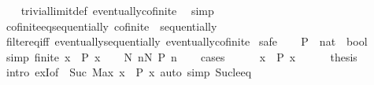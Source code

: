 \begin{isabellebody}
%
\isadelimproof
\ \ %
\endisadelimproof
%
\isatagproof
{}\isamarkupfalse%
\ trivial{\isacharunderscore}{\kern0pt}limit{\isacharunderscore}{\kern0pt}def\ eventually{\isacharunderscore}{\kern0pt}cofinite\ \isamarkupfalse%
\ simp%
\endisatagproof
{\isafoldproof}%
%
\isadelimproof
\isanewline
%
\endisadelimproof
\isanewline
{}\isamarkupfalse%
\ cofinite{\isacharunderscore}{\kern0pt}eq{\isacharunderscore}{\kern0pt}sequentially{\isacharcolon}{\kern0pt}\ {\isachardoublequoteopen}cofinite\ {\isacharequal}{\kern0pt}\ sequentially{\isachardoublequoteclose}\isanewline
%
\isadelimproof
\ \ %
\endisadelimproof
%
\isatagproof
{}\isamarkupfalse%
\ filter{\isacharunderscore}{\kern0pt}eq{\isacharunderscore}{\kern0pt}iff\ eventually{\isacharunderscore}{\kern0pt}sequentially\ eventually{\isacharunderscore}{\kern0pt}cofinite\isanewline
{}\isamarkupfalse%
\ safe\isanewline
\ \ \isamarkupfalse%
\ P\ {\isacharcolon}{\kern0pt}{\isacharcolon}{\kern0pt}\ {\isachardoublequoteopen}nat\ {\isasymRightarrow}\ bool{\isachardoublequoteclose}\ \isamarkupfalse%
\ {\isacharbrackleft}{\kern0pt}simp{\isacharbrackright}{\kern0pt}{\isacharcolon}{\kern0pt}\ {\isachardoublequoteopen}finite\ {\isacharbraceleft}{\kern0pt}x{\isachardot}{\kern0pt}\ {\isasymnot}\ P\ x{\isacharbraceright}{\kern0pt}{\isachardoublequoteclose}\isanewline
\ \ \isamarkupfalse%
\ {\isachardoublequoteopen}{\isasymexists}N{\isachardot}{\kern0pt}\ {\isasymforall}n{\isasymge}N{\isachardot}{\kern0pt}\ P\ n{\isachardoublequoteclose}\isanewline
\ \ \isamarkupfalse%
\ cases\isanewline
\ \ \ \ \isamarkupfalse%
\ {\isachardoublequoteopen}{\isacharbraceleft}{\kern0pt}x{\isachardot}{\kern0pt}\ {\isasymnot}\ P\ x{\isacharbraceright}{\kern0pt}\ {\isasymnoteq}\ {\isacharbraceleft}{\kern0pt}{\isacharbraceright}{\kern0pt}{\isachardoublequoteclose}\ \isamarkupfalse%
\ \isamarkupfalse%
\ {\isacharquery}{\kern0pt}thesis\isanewline
\ \ \ \ \ \ \isamarkupfalse%
\ {\isacharparenleft}{\kern0pt}intro\ exI{\isacharbrackleft}{\kern0pt}of\ {\isacharunderscore}{\kern0pt}\ {\isachardoublequoteopen}Suc\ {\isacharparenleft}{\kern0pt}Max\ {\isacharbraceleft}{\kern0pt}x{\isachardot}{\kern0pt}\ {\isasymnot}\ P\ x{\isacharbraceright}{\kern0pt}{\isacharparenright}{\kern0pt}{\isachardoublequoteclose}{\isacharbrackright}{\kern0pt}{\isacharparenright}{\kern0pt}\ {\isacharparenleft}{\kern0pt}auto\ simp{\isacharcolon}{\kern0pt}\ Suc{\isacharunderscore}{\kern0pt}le{\isacharunderscore}{\kern0pt}eq{\isacharparenright}{\kern0pt}\isanewline

\end{isabellebody}
